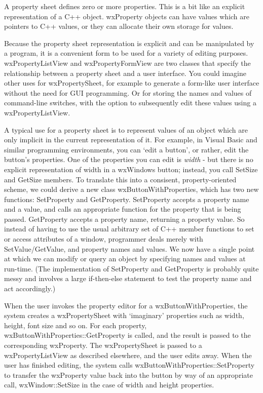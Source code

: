 A property sheet defines zero or more properties. This is a bit like an explicit representation of
a C++ object. wxProperty objects can have values which are pointers to C++ values, or they
can allocate their own storage for values.

Because the property sheet representation is explicit and can be manipulated by
a program, it is a convenient form to be used for a variety of
editing purposes. wxPropertyListView and wxPropertyFormView are two classes that
specify the relationship between a property sheet and a user interface. You could imagine
other uses for wxPropertySheet, for example to generate a form-like user interface without
the need for GUI programming. Or for storing the names and values of command-line switches, with the
option to subsequently edit these values using a wxPropertyListView.

A typical use for a property sheet is to represent values of an object
which are only implicit in the current representation of it. For
example, in Visual Basic and similar programming environments, you can
`edit a button', or rather, edit the button's properties.  One of the
properties you can edit is {\it width} - but there is no explicit
representation of width in a wxWindows button; instead, you call SetSize
and GetSize members. To translate this into a consisent,
property-oriented scheme, we could derive a new class
wxButtonWithProperties, which has two new functions: SetProperty and
GetProperty.  SetProperty accepts a property name and a value, and calls
an appropriate function for the property that is being passed.
GetProperty accepts a property name, returning a property value. So
instead of having to use the usual arbitrary set of C++ member functions
to set or access attributes of a window, programmer deals merely with
SetValue/GetValue, and property names and values.
We now have a single point at which we can modify or query an object by specifying
names and values at run-time. (The implementation of SetProperty and GetProperty
is probably quite messy and involves a large if-then-else statement to
test the property name and act accordingly.)

When the user invokes the property editor for a wxButtonWithProperties, the system
creates a wxPropertySheet with `imaginary' properties such as width, height, font size
and so on. For each property, wxButtonWithProperties::GetProperty is called, and the result is
passed to the corresponding wxProperty. The wxPropertySheet is passed to a wxPropertyListView
as described elsewhere, and the user edits away. When the user has finished editing, the system calls
wxButtonWithProperties::SetProperty to transfer the wxProperty value back into the button
by way of an appropriate call, wxWindow::SetSize in the case of width and height properties.



